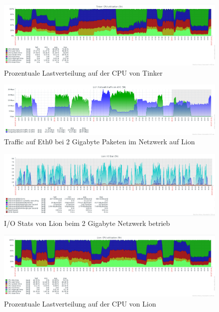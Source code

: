 \begin{figure}[htbp]
\centering
\includegraphics*[width=0.9\linewidth, angle=90]{Abb/ZabbixTinker/Standard/CPUStandard2000}

\caption{Prozentuale Lastverteilung auf der CPU von Tinker}
\label{fig:CPUTinker2000}
\end{figure}



\begin{figure}[htbp]
\centering
\includegraphics*[width=0.9\linewidth, angle=90]{Abb/ZabbixLion/Standard/Standard2000}

\caption{Traffic auf Eth0 bei 2 Gigabyte Paketen im Netzwerk auf Lion}
\label{fig:Eth0Lion2000}
\end{figure}


\begin{figure}[htbp]
\centering
\includegraphics*[width=0.9\linewidth, angle=90]{Abb/ZabbixLion/Standard/IoStatStandard2000}

\caption{I/O Stats von Lion beim 2 Gigabyte Netzwerk betrieb}
\label{fig:IoStatLion2000}
\end{figure} %

\begin{figure}[htbp]
\centering
\includegraphics*[width=0.9\linewidth, angle=90]{Abb/ZabbixLion/Standard/CPUStandard2000}

\caption{Prozentuale Lastverteilung auf der CPU von Lion}
\label{fig:CPULion2000}
\end{figure}


